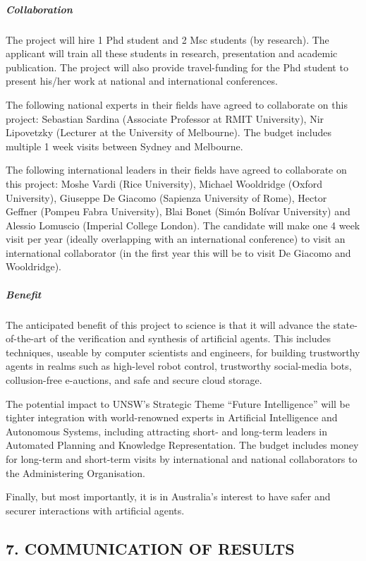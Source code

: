 \documentclass[a4paper,12pt]{scrartcl}
\begin{document}
\subparagraph{Collaboration}

The project will hire 1 Phd student and 2 Msc students (by research). The applicant will train all these students in research, presentation and academic publication.  The project will also provide travel-funding for the Phd student to present his/her work at national and international conferences.

The following national experts in their fields have agreed to collaborate on this project: Sebastian Sardina (Associate Professor at RMIT University), Nir Lipovetzky (Lecturer at the University of Melbourne). The budget includes multiple 1 week visits between Sydney and Melbourne.

The following international leaders in their fields have agreed to collaborate on this project: Moshe Vardi (Rice University), Michael Wooldridge (Oxford University), Giuseppe De Giacomo (Sapienza University of Rome), Hector Geffner (Pompeu Fabra University), Blai Bonet (Sim\'on Bol\'ivar University) and Alessio Lomuscio (Imperial College London). The candidate will make one 4 week visit per year (ideally overlapping with an international conference) to visit an international collaborator (in the first year this will be to visit De Giacomo and Wooldridge).



\subparagraph{Benefit}
 
The anticipated benefit of this project to science is that it will advance the state-of-the-art of the verification and synthesis of artificial agents. This includes techniques, useable by computer scientists and engineers, for building trustworthy agents in realms such as high-level robot control, trustworthy social-media bots, collusion-free e-auctions, and safe and secure cloud storage.

The potential impact to UNSW's Strategic Theme ``Future Intelligence'' will be tighter integration with world-renowned experts in Artificial Intelligence and Autonomous Systems, including attracting short- and long-term leaders in Automated Planning and Knowledge Representation. The budget includes money for long-term and short-term visits by international and national collaborators to the Administering Organisation.

Finally, but most importantly, it is in Australia's interest to have safer and securer interactions with artificial agents.


\subsection*{7. COMMUNICATION OF RESULTS}
\end{document}
